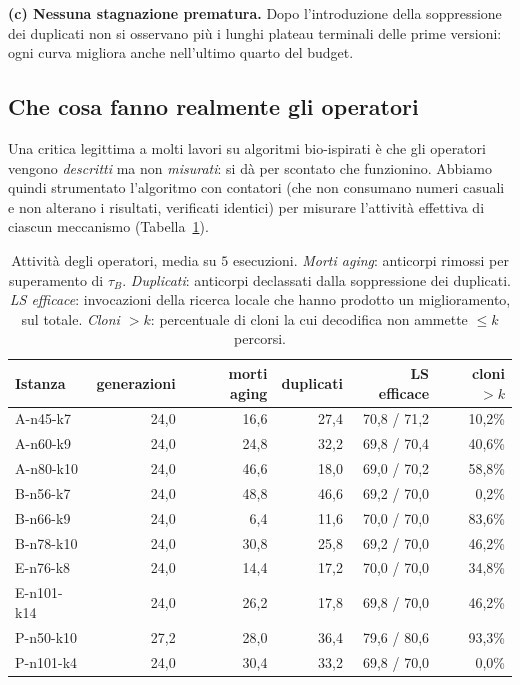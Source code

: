 \documentclass[10pt,a4paper]{article}
\begin{document}
\textbf{(c) Nessuna stagnazione prematura.} Dopo l'introduzione della soppressione
dei duplicati non si osservano più i lunghi plateau terminali delle prime versioni:
ogni curva migliora anche nell'ultimo quarto del budget.

\subsection{Che cosa fanno realmente gli operatori}

Una critica legittima a molti lavori su algoritmi bio-ispirati è che gli
operatori vengono \emph{descritti} ma non \emph{misurati}: si dà per scontato che
funzionino. Abbiamo quindi strumentato l'algoritmo con contatori (che non
consumano numeri casuali e non alterano i risultati, verificati identici) per
misurare l'attività effettiva di ciascun meccanismo
(Tabella~\ref{tab:operatori}).

\begin{table}[H]
\centering
\small
\caption{Attività degli operatori, media su $5$ esecuzioni. \emph{Morti aging}:
anticorpi rimossi per superamento di $\tau_B$. \emph{Duplicati}: anticorpi
declassati dalla soppressione dei duplicati. \emph{LS efficace}: invocazioni della
ricerca locale che hanno prodotto un miglioramento, sul totale. \emph{Cloni
$>k$}: percentuale di cloni la cui decodifica non ammette $\le k$ percorsi.}
\label{tab:operatori}
\begin{tabular}{lrrrrr}
\toprule
Istanza & generazioni & morti aging & duplicati & LS efficace & cloni $>k$ \\
\midrule
A-n45-k7   & 24,0 & 16,6 & 27,4 & 70,8 / 71,2 & 10,2\% \\
A-n60-k9   & 24,0 & 24,8 & 32,2 & 69,8 / 70,4 & 40,6\% \\
A-n80-k10  & 24,0 & 46,6 & 18,0 & 69,0 / 70,2 & 58,8\% \\
B-n56-k7   & 24,0 & 48,8 & 46,6 & 69,2 / 70,0 & 0,2\% \\
B-n66-k9   & 24,0 & 6,4  & 11,6 & 70,0 / 70,0 & 83,6\% \\
B-n78-k10  & 24,0 & 30,8 & 25,8 & 69,2 / 70,0 & 46,2\% \\
E-n76-k8   & 24,0 & 14,4 & 17,2 & 70,0 / 70,0 & 34,8\% \\
E-n101-k14 & 24,0 & 26,2 & 17,8 & 69,8 / 70,0 & 46,2\% \\
P-n50-k10  & 27,2 & 28,0 & 36,4 & 79,6 / 80,6 & 93,3\% \\
P-n101-k4  & 24,0 & 30,4 & 33,2 & 69,8 / 70,0 & 0,0\% \\
\bottomrule
\end{tabular}
\end{table}
\end{document}
